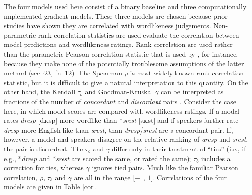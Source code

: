 The four models used here consist of a binary baseline and three computationally implemented gradient models. These three models are chosen because prior studies have shown they are correlated with wordlikeness judgements. Non-parametric rank correlation statistics are used evaluate the correlation between model predictions and wordlikeness ratings. Rank correlation are used rather than the parametric Pearson correlation statistic that is used by \citet{Hayes2008a}, for instance, because they make none of the potentially troublesome assumptions of the latter method (see \citealt{Albright2009a}:23, fn. 12). The Spearman $\rho$ is most widely known rank correlation statistic, but it is difficult to give a natural interpretation to this quantity. On the other hand, the Kendall $\tau_b$ and Goodman-Kruskal $\gamma$ can be interpreted as fractions of the number of \emph{concordant} and \emph{discordant} pairs \citep{Noether1981}. Consider the case here, in which model scores are compared with wordlikeness ratings. If a model rates \emph{dresp} [dɹɛsp] more wordlike than *\emph{srest} [sɹɛst] and if speakers further rate \emph{dresp} more English-like than \emph{srest}, than \emph{dresp}/\emph{srest} are a concordant pair. If, however, a model and speakers disagree on the relative ranking of \emph{dresp} and \emph{srest}, the pair is discordant. The $\tau_b$ and $\gamma$ differ only in their treatment of ``ties'' (i.e., if e.g., *\emph{dresp} and *\emph{srest} are scored the same, or rated the same); $\tau_b$ includes a correction for ties, whereas $\gamma$ ignores tied pairs. Much like the familiar Pearson correlation, $\rho$, $\tau_b$ and $\gamma$ are all in the range [$-1$, $1$]. Correlations of the four models are given in Table \ref{cor}.

